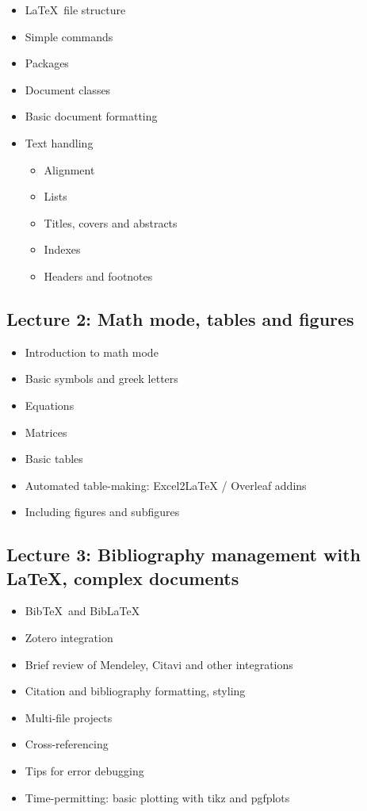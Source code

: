 \documentclass[a4paper,11pt]{article}
\begin{document}
\begin{itemize}
    \item \LaTeX \ file structure
    \item Simple commands
    \item Packages
    \item Document classes
    \item Basic document formatting
    \item Text handling
    \begin{itemize}
        \item Alignment
        \item Lists
        \item Titles, covers and abstracts
        \item Indexes
        \item Headers and footnotes 
    \end{itemize}
\end{itemize}

\subsection{Lecture 2: Math mode, tables and figures}

\begin{itemize}
    \item Introduction to math mode
    \item Basic symbols and greek letters
    \item Equations
    \item Matrices
    \item Basic tables
    \item Automated table-making: Excel2LaTeX / Overleaf addins
    \item Including figures and subfigures
\end{itemize}

\subsection{Lecture 3: Bibliography management with \LaTeX, complex documents}

\begin{itemize}
    \item Bib\TeX \ and Bib\LaTeX
    \item Zotero integration
    \item Brief review of Mendeley, Citavi and other integrations
    \item Citation and bibliography formatting, styling
    \item Multi-file projects
    \item Cross-referencing
    \item Tips for error debugging
    \item Time-permitting: basic plotting with \textsf{tikz} and \textsf{pgfplots}
\end{itemize}
\end{document}
